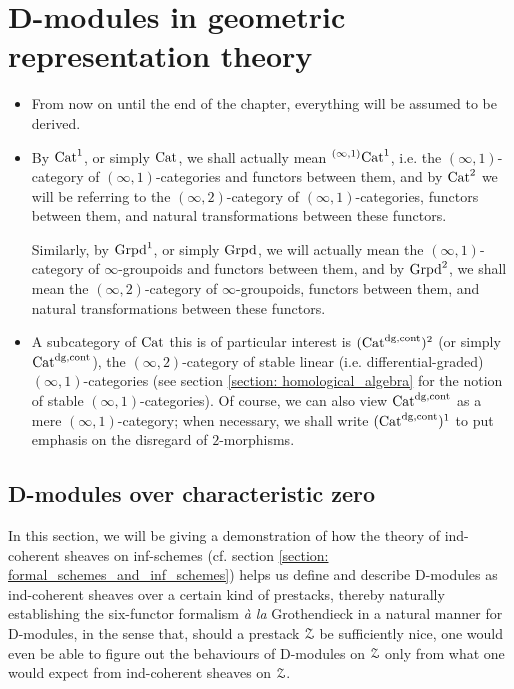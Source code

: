 \chapter{D-modules in geometric representation theory}
    \begin{abstract}
        
    \end{abstract}
    
    \minitoc
    
    \begin{convention} \label{conv: D_modules_everything_is_derived}
        \noindent
        \begin{itemize}
            \item From now on until the end of the chapter, everything will be assumed to be derived. 
            \item By $\mathrm{Cat}^1$, or simply $\mathrm{Cat}$, we shall actually mean ${}^{(\infty, 1)}\mathrm{Cat}^1$, i.e. the $(\infty, 1)$-category of $(\infty, 1)$-categories and functors between them, and by $\mathrm{Cat}^2$ we will be referring to the $(\infty, 2)$-category of $(\infty, 1)$-categories, functors between them, and natural transformations between these functors. 
            
            Similarly, by $\mathrm{Grpd}^1$, or simply $\mathrm{Grpd}$, we will actually mean the $(\infty, 1)$-category of $\infty$-groupoids and functors between them, and by $\mathrm{Grpd}^2$, we shall mean the $(\infty, 2)$-category of $\infty$-groupoids, functors between them, and natural transformations between these functors.
            \item A subcategory of $\mathrm{Cat}$ this is of particular interest is $(\mathrm{Cat}^{\mathrm{dg}, \mathrm{cont}})^2$ (or simply $\mathrm{Cat}^{\mathrm{dg}, \mathrm{cont}}$), the $(\infty, 2)$-category of stable linear (i.e. differential-graded) $(\infty, 1)$-categories (see section \ref{section: homological_algebra} for the notion of stable $(\infty, 1)$-categories). Of course, we can also view $\mathrm{Cat}^{\mathrm{dg}, \mathrm{cont}}$ as a mere $(\infty, 1)$-category; when necessary, we shall write $(\mathrm{Cat}^{\mathrm{dg}, \mathrm{cont}})^1$ to put emphasis on the disregard of $2$-morphisms.
        \end{itemize} 
    \end{convention}
    
    \section{D-modules over characteristic zero}
        In this section, we will be giving a demonstration of how the theory of ind-coherent sheaves on inf-schemes (cf. section \ref{section: formal_schemes_and_inf_schemes}) helps us define and describe D-modules as ind-coherent sheaves over a certain kind of prestacks, thereby naturally establishing the six-functor formalism \textit{\`a la} Grothendieck in a natural manner for D-modules, in the sense that, should a prestack $\mathcal{Z}$ be sufficiently nice, one would even be able to figure out the behaviours of D-modules on $\mathcal{Z}$ only from what one would expect from ind-coherent sheaves on $\mathcal{Z}$. 
        

